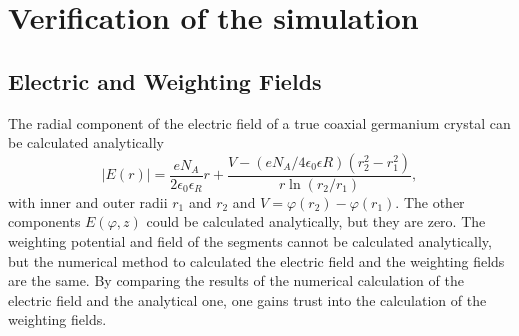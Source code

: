 \section{Verification of the simulation}
\label{sec:verify}
\subsection{Electric and Weighting Fields}
\label{subsec:efield_wfield}
The radial component of the electric field of a true coaxial germanium crystal can be calculated analytically 
\begin{equation}
  \label{eq:EFieldAnalytical}
  |E(r)| = \frac{eN_{A}}{2\epsilon_{0}\epsilon_{R}} r + \frac{V - (eN_{A}/4\epsilon_{0}\epsilon{R})(r_{2}^{2}-r_{1}^{2})}{r \ln(r_{2}/r_{1})},
\end{equation}
with inner and outer radii $r_1$ and $r_2$ and $V = \varphi(r_2) - \varphi(r_1)$. The other components $E(\varphi,z)$ could be calculated analytically, but they are zero.
The weighting potential and field of the segments cannot be calculated analytically, but the numerical method to calculated the electric field and the weighting fields are the same. By comparing the results of the numerical calculation of the electric field and the analytical one, one gains trust into the calculation of the weighting fields.


